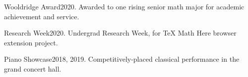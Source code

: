 \documentclass{awesome-cv}
\newcommand*{\lmr}{\fontfamily{lmr}\selectfont}
\renewcommand*{\bodyfont}{\lmr}
\newcommand{\bodyfontsize}{\fontsize{10.5pt}{1em}}
\renewcommand*{\descriptionstyle}[1]{{\bodyfontsize\bodyfont\upshape\color{text} #1}}
\begin{document}
  \vspace{14pt}
  \descriptionstyle{
    \begin{cvlabeleditems}
    \item{Wooldridge Award}{2020. Awarded to one rising senior math major for academic achievement and service.}
    \item{Research Week}{2020. Undergrad Research Week, for \TeX{} Math Here browser extension project.}
    \item{Piano Showcase}{2018, 2019. Competitively-placed classical performance in the grand concert hall.}
    \end{cvlabeleditems}}
\end{document}

